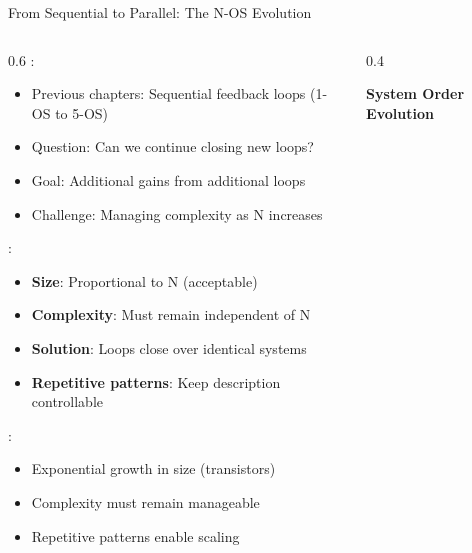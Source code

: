 \begin{frame}{From Sequential to Parallel: The N-OS Evolution}
\begin{columns}
\begin{column}{0.6\textwidth}
:
\begin{itemize}
\item Previous chapters: Sequential feedback loops (1-OS to 5-OS)
\item Question: Can we continue closing new loops?
\item Goal: Additional gains from additional loops
\item Challenge: Managing complexity as N increases
\end{itemize}

\vspace{0.3cm}
:
\begin{itemize}
\item \textbf{Size}: Proportional to N (acceptable)
\item \textbf{Complexity}: Must remain independent of N
\item \textbf{Solution}: Loops close over identical systems
\item \textbf{Repetitive patterns}: Keep description controllable
\end{itemize}

\vspace{0.3cm}
:
\begin{itemize}
\item Exponential growth in size (transistors)
\item Complexity must remain manageable
\item Repetitive patterns enable scaling
\end{itemize}
\end{column}
\begin{column}{0.4\textwidth}
\begin{center}
\textbf{System Order Evolution}
\vspace{0.3cm}

\end{center}
\end{column}
\end{columns}
\end{frame}
